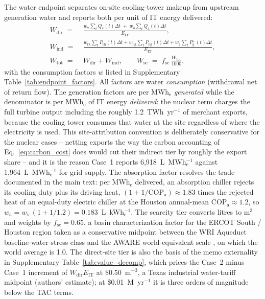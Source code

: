 The water endpoint separates on-site cooling-tower makeup from upstream generation water and reports both per unit of IT energy delivered:
\begin{align}
W_\mathrm{dir} \;=\;& \frac{w_\mathrm{v} \sum_t Q_\mathrm{v}(t)\Delta t \;+\; w_\mathrm{a} \sum_t Q_\mathrm{a}(t)\Delta t}{E_\mathrm{IT}}, \label{eq:water_direct}\\
W_\mathrm{ind} \;=\;& \frac{w_\mathrm{rx} \sum_t P_\mathrm{tn}(t)\Delta t + w_\mathrm{ng} \sum_t P_\mathrm{ng}(t)\Delta t + w_\mathrm{g} \sum_t P_\mathrm{g}^{+}(t)\Delta t}{E_\mathrm{IT}}, \label{eq:water_indirect}\\
W_\mathrm{tot} \;=\;& W_\mathrm{dir} + W_\mathrm{ind}, \qquad
W_\mathrm{sc} \;=\; f_\mathrm{sc}\, \frac{W_\mathrm{tot}}{1000}, \label{eq:water_scarcity}
\end{align}
with the consumption factors $w$ listed in Supplementary Table~\ref{tab:endpoint_factors}. All factors are water \emph{consumption} (withdrawal net of return flow). The generation factors are per MWh$_\mathrm{e}$ \emph{generated} while the denominator is per MWh$_\mathrm{e}$ of IT energy \emph{delivered}: the nuclear term charges the full turbine output including the roughly 1.2~TWh~yr$^{-1}$ of merchant exports, because the cooling tower consumes that water at the site regardless of where the electricity is used. This site-attribution convention is deliberately conservative for the nuclear cases -- netting exports the way the carbon accounting of Eq.~\eqref{eq:carbon_cost} does would cut their indirect tier by roughly the export share -- and it is the reason Case~1 reports 6{,}918~L~MWh$_\mathrm{e}^{-1}$ against 1{,}964~L~MWh$_\mathrm{e}^{-1}$ for grid supply. The absorption factor resolves the trade documented in the main text: per MWh$_\mathrm{c}$ delivered, an absorption chiller rejects its cooling duty plus its driving heat, $(1+1/\mathrm{COP}_\mathrm{a})\approx 1.83$ times the rejected heat of an equal-duty electric chiller at the Houston annual-mean $\mathrm{COP}_\mathrm{a}\approx1.2$, so $w_\mathrm{a} = w_\mathrm{v}\,(1+1/1.2) = 0.183$~L~kWh$_\mathrm{c}^{-1}$. The scarcity tier converts litres to m$^3$ and weights by $f_\mathrm{sc}=0.65$, a basin characterization factor for the ERCOT South / Houston region taken as a conservative midpoint between the WRI Aqueduct baseline-water-stress class \citep{wri2023aqueduct} and the AWARE world-equivalent scale \citep{boulay2018aware}, on which the world average is 1.0. The direct-site tier is also the basis of the memo externality in Supplementary Table~\ref{tab:value_decomp}, which prices the Case~2 minus Case~1 increment of $W_\mathrm{dir} E_\mathrm{IT}$ at \$0.50~m$^{-3}$, a Texas industrial water-tariff midpoint (authors' estimate); at \$0.01~M~yr$^{-1}$ it is three orders of magnitude below the TAC terms.


